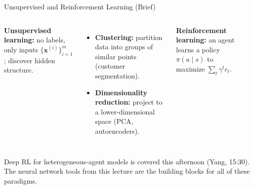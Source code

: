 \documentclass[aspectratio=169,11pt]{beamer}
\newcommand{\x}{\bm{x}}
\begin{document}
\begin{frame}{Unsupervised and Reinforcement Learning (Brief)}
\begin{columns}[T]
\textbf{Unsupervised learning:} no labels, only inputs $\{\x^{(i)}\}_{i=1}^{m}$; discover hidden structure.
\begin{itemize}
    \item \textbf{Clustering:} partition data into groups of similar points (customer segmentation).
    \item \textbf{Dimensionality reduction:} project to a lower-dimensional space (PCA, autoencoders).
\end{itemize}

\textbf{Reinforcement learning:} an agent learns a policy $\pi(a\mid s)$ to maximize $\sum_{t}\gamma^t r_t$.

\vspace{0.2cm}
\begin{center}
\end{center}
\end{columns}

\vspace{0.5cm}
{\small Deep RL for heterogeneous-agent models is covered this afternoon (Yang, 15:30).  The neural network tools from this lecture are the building blocks for all of these paradigms.}
\end{frame}

\end{document}
